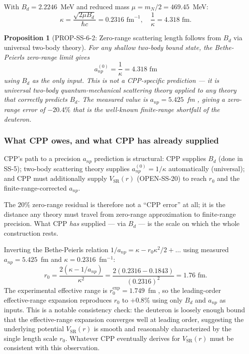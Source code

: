 \documentclass[11pt,letterpaper]{article}
\newtheorem{proposition}[theorem]{Proposition}
\newcommand{\Bd}{B_{d}}
\newcommand{\anp}{a_{np}}
\newcommand{\rzero}{r_{0}}
\newcommand{\VSR}{V_{\mathrm{SR}}}
\begin{document}
With $\Bd = 2.2246$~MeV \cite{ame2020} and reduced mass $\mu = m_N/2 = 469.45$~MeV:
\[
\kappa = \frac{\sqrt{2 \mu \Bd}}{\hbar c} = 0.2316 \text{ fm}^{-1}, \quad \frac{1}{\kappa} = 4.318 \text{ fm}.
\]

\begin{proposition}[PROP-SS-6-2: Zero-range scattering length follows from $\Bd$ via universal two-body theory]
\label{prop:anp_zero_range}
For any shallow two-body bound state, the Bethe-Peierls zero-range limit gives
\[
\anp^{(0)} = \frac{1}{\kappa} = 4.318 \text{ fm}
\]
using $\Bd$ as the only input. This is not a CPP-specific prediction --- it is universal two-body quantum-mechanical scattering theory applied to any theory that correctly predicts $\Bd$. The measured value is $\anp = 5.425$~fm \cite{anp_reference}, giving a zero-range error of $-20.4\%$ that is the well-known finite-range shortfall of the deuteron.
\end{proposition}

\subsubsection{What CPP owes, and what CPP has already supplied}

CPP's path to a precision $\anp$ prediction is structural: CPP supplies $\Bd$ (done in SS-5); two-body scattering theory supplies $\anp^{(0)} = 1/\kappa$ automatically (universal); and CPP must additionally supply $\VSR(r)$ (OPEN-SS-20) to reach $\rzero$ and the finite-range-corrected $\anp$.

The $20\%$ zero-range residual is therefore not a ``CPP error'' at all; it is the distance any theory must travel from zero-range approximation to finite-range precision. What CPP \emph{has} supplied --- via $\Bd$ --- is the scale on which the whole construction rests.

Inverting the Bethe-Peierls relation $1/\anp = \kappa - \rzero \kappa^2/2 + \ldots$ using measured $\anp = 5.425$~fm and $\kappa = 0.2316$~fm$^{-1}$:
\[
\rzero = \frac{2(\kappa - 1/\anp)}{\kappa^2} = \frac{2(0.2316 - 0.1843)}{(0.2316)^2} = 1.76 \text{ fm}.
\]
The experimental effective range is $\rzero^{\mathrm{exp}} = 1.749$~fm \cite{effective_range}, so the leading-order effective-range expansion reproduces $\rzero$ to $+0.8\%$ using only $\Bd$ and $\anp$ as inputs. This is a notable consistency check: the deuteron is loosely enough bound that the effective-range expansion converges well at leading order, suggesting the underlying potential $\VSR(r)$ is smooth and reasonably characterized by the single length scale $\rzero$. Whatever CPP eventually derives for $\VSR(r)$ must be consistent with this observation.
\end{document}
